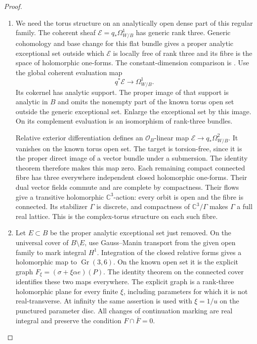 \begin{proof}
\begin{enumerate}[label={$\langle1\rangle$\arabic*.}]
\item We need the torus structure on an analytically open dense
part of this regular family.  The coherent sheaf
$\mathcal E=q_*\Omega^1_{W/B}$ has generic rank three.
Generic cohomology and base change for this flat bundle gives
a proper analytic exceptional set outside which $\mathcal E$
is locally free of rank three and its fibre is the space of
holomorphic one-forms.  The constant-dimension comparison is
\cite[\S7, Satz 5, pp.~63--64]{Grauert60}.
Use the global coherent evaluation map
\[
 q^*\mathcal E\longrightarrow\Omega^1_{W/B}.
\]
Its cokernel has analytic support.  The proper image of that
support is analytic in $B$ and omits the nonempty part of the
known torus open set outside the generic exceptional set.
Enlarge the exceptional set by this image.  On its complement
evaluation is an isomorphism of rank-three bundles.

Relative exterior differentiation defines an
$\mathcal O_B$-linear map
$\mathcal E\to q_*\Omega^2_{W/B}$.  It vanishes on the known
torus open set.  The target is torsion-free, since it is the
proper direct image of a vector bundle under a submersion.
The identity theorem therefore makes this map zero.  Each
remaining compact connected fibre has three everywhere
independent closed holomorphic one-forms.  Their dual vector
fields commute and are complete by compactness.  Their flows
give a transitive holomorphic $\mathbb C^3$-action: every orbit
is open and the fibre is connected.  Its stabilizer $\Gamma$
is discrete, and compactness of $\mathbb C^3/\Gamma$ makes
$\Gamma$ a full real lattice.  This is the complex-torus
structure on each such fibre.

\item Let $E\subset B$ be the proper analytic exceptional set just
removed.  On the universal cover of $B\setminus E$, use
Gauss--Manin transport from the given open family to mark
integral $H^1$.  Integration of the closed relative forms
gives a holomorphic map to $\operatorname{Gr}(3,6)$.  On the
known open set it is the explicit graph
$F_\xi=(\sigma+\xi\alpha e)(P)$.  The identity theorem on the
connected cover identifies these two maps everywhere.
The explicit graph is a rank-three holomorphic plane for
every finite $\xi$, including parameters for which it is not
real-transverse.  At infinity the same assertion is used with
$\xi=1/u$ on the punctured parameter disc.  All changes of
continuation marking are real integral and preserve the
condition $F\cap\bar F=0$.


\end{enumerate}
\end{proof}
